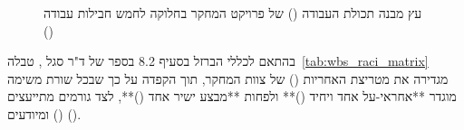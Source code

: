 \begin{figure}[htbp]
\begin{english}
\end{english}
\caption{עץ מבנה תכולת העבודה () של פרויקט המחקר בחלוקה לחמש חבילות עבודה () \cite{segal2026prep,pmbok2021}}
\label{fig:wbs_tree}
\end{figure}

בהתאם לכללי הברזל בסעיף \num{8.2} בספר של ד"ר סגל \cite{segal2026prep}, טבלה~\ref{tab:wbs_raci_matrix} מגדירה את מטריצת האחריות () של צוות המחקר, תוך הקפדה על כך שבכל שורת משימה מוגדר **אחראי-על אחד ויחיד ()** ולפחות **מבצע ישיר אחד ()**, לצד גורמים מתייעצים () ומיודעים ().


